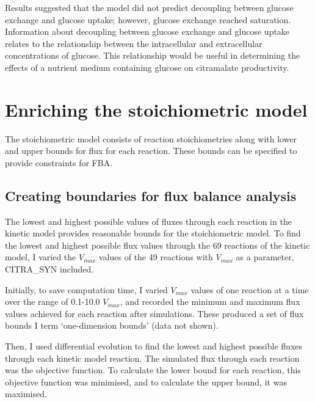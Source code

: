 \documentclass[parskip=full, numbers=noenddot]{scrreprt}
\begin{document}
Results suggested that the model did not predict decoupling between glucose exchange and glucose uptake; however, glucose exchange reached saturation.
Information about decoupling between glucose exchange and glucose uptake relates to the relationship between the intracellular and extracellular concentrations of glucose. This relationship would be useful in determining the effects of a nutrient medium containing glucose on citramalate productivity.

\chapter{Enriching the stoichiometric model}
\label{ch:stoich}

The stoichiometric model consists of reaction stoichiometries along with lower and upper bounds for flux for each reaction. These bounds can be specified to provide constraints for FBA.%
\section{Creating boundaries for flux balance analysis}
\label{sec:bounds}

The lowest and highest possible values of fluxes through each reaction in the kinetic model provides reasonable bounds for the stoichiometric model.
To find the lowest and highest possible flux values through the 69 reactions of the kinetic model, I varied the $V_{max}$ values of the 49 reactions with $V_{max}$ as a parameter, CITRA\_SYN included.

Initially, to save computation time, I varied $V_{max}$ values of one reaction at a time over the range of 0.1-10.0 $V_{max}$, and recorded the minimum and maximum flux values achieved for each reaction after simulations. These produced a set of flux bounds I term `one-dimension bounds' (data not shown).

Then, I used differential evolution to find the lowest and highest possible fluxes through each kinetic model reaction. The simulated flux through each reaction was the objective function. To calculate the lower bound for each reaction, this objective function was minimised, and to calculate the upper bound, it was maximised.
\end{document}
